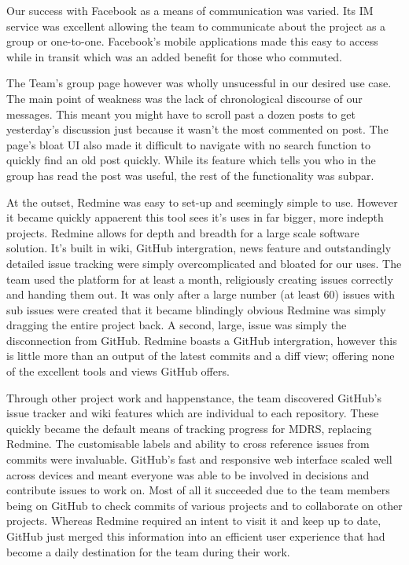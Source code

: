 \documentclass{l3proj}
\begin{document}
Our success with Facebook as a means of communication was varied. Its IM service was excellent allowing the team to communicate about the project as a group or one-to-one. Facebook's mobile applications made this easy to access while in transit which was an added benefit for those who commuted.

The Team's group page however was wholly unsucessful in our desired use case. The main point of weakness was the lack of chronological discourse of our messages. This meant you might have to scroll past a dozen posts to get yesterday's discussion just because it wasn't the most commented on post. The page's bloat UI also made it difficult to navigate with no search function to quickly find an old post quickly. While its feature which tells you who in the group has read the post was useful, the rest of the functionality was subpar.

At the outset, Redmine was easy to set-up and seemingly simple to use. However it became quickly appaerent this tool sees it's uses in far bigger, more indepth projects. 
Redmine allows for depth and breadth for a large scale software solution. It's built in wiki, GitHub intergration, news feature and outstandingly detailed issue tracking were simply overcomplicated and bloated for our uses.
The team used the platform for at least a month, religiously creating issues correctly and handing them out. It was only after a large number (at least 60) issues with sub issues were created that it became blindingly obvious Redmine was simply dragging the entire project back.
A second, large, issue was simply the disconnection from GitHub. Redmine boasts a GitHub intergration, however this is little more than an output of the latest commits and a diff view; offering none of the excellent tools and views GitHub offers.

Through other project work and happenstance, the team discovered GitHub's issue
tracker and wiki features which are individual to each repository. These quickly
became the default means of tracking progress for MDRS, replacing Redmine. The
customisable labels and ability to cross reference issues from commits were
invaluable. GitHub's fast and responsive web interface scaled well across
devices and meant everyone was able to be involved in decisions and contribute
issues to work on. Most of all it succeeded due to the team members being on GitHub to check commits of various projects and to collaborate on other projects. Whereas Redmine required an intent to visit it and keep up to date, GitHub just merged this information into an efficient user experience that had become a daily destination for the team during their work.
\end{document}
